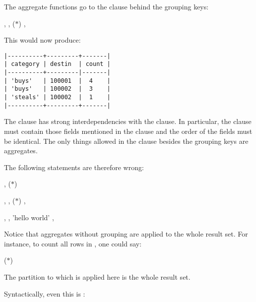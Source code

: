 The aggregate functions go to the  clause
behind the grouping keys:

 ,
                 ,
                 ($\ast$)
 
 , 

This would now produce:

\begin{minipage}{\textwidth}
\begin{verbatim}
|----------+---------+-------|
| category | destin  | count |
|----------+---------|-------|
| 'buys'   | 100001  |  4    |
| 'buys'   | 100002  |  3    |
| 'steals' | 100002  |  1    |
|----------+---------+-------|
\end{verbatim}
\end{minipage}

The  clause has strong interdependencies
with the  clause.
In particular, the  clause must
contain those fields mentioned in the
 clause and the order of the fields
must be identical. The only things allowed in
the  clause besides the grouping keys
are aggregates. 

The following statements are therefore wrong:

 , 
                 ($\ast$)
 
 

 ,
                 , 
                 ($\ast$)
 
 , 

 , 
                 ,
                 'hello world'
 
 , 

Notice that aggregates without grouping
are applied to the whole result set.
For instance, to count all rows in ,
one could say:

 ($\ast$)
 

The partition to which  is applied here
is the whole result set.

Syntactically, even this is :


